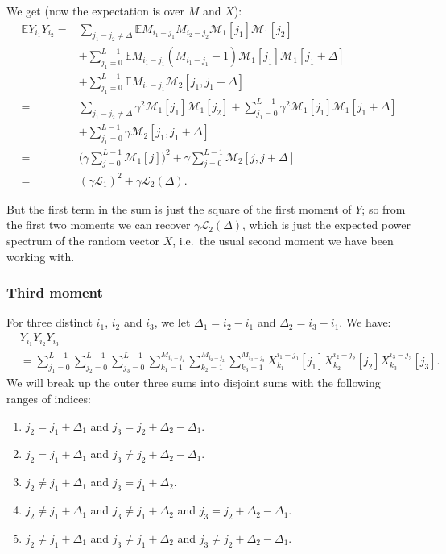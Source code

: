 \documentclass[12pt]{article}
\newcommand{\E}{\mathbb{E}}
\newcommand{\1}{\mathbf{1}}
\newcommand{\M}{\mathcal{M}}
\renewcommand{\L}{\mathcal{L}}
\theoremstyle{plain}
\theoremstyle{definition}
\theoremstyle{remark}
\theoremstyle{plain}
\theoremstyle{remark}
\theoremstyle{plain}
\theoremstyle{plain}
\theoremstyle{plain}
\numberwithin{equation}{section}
\begin{document}
We get (now the expectation is over $M$ and $X$):
%
\begin{align}
%
\E Y_{i_1} Y_{i_2} 
=& \sum_{j_1 - j_2 \ne \Delta} \E M_{i_1-j_1} M_{i_2 - j_2} \M_1[j_1] \M_1[j_2]
\nonumber \\
& + \sum_{j_1 = 0}^{L-1} \E M_{i_1-j_1}(M_{i_1-j_1} - 1) \M_1[j_1] \M_1[j_1 + \Delta]
\nonumber \\
& + \sum_{j_1 = 0}^{L-1} \E M_{i_1-j_1} \M_2[j_1,j_1 + \Delta]
\nonumber \\
=& \sum_{j_1 - j_2 \ne \Delta} \gamma^2 \M_1[j_1] \M_1[j_2]
+ \sum_{j_1 = 0}^{L-1} \gamma^2 \M_1[j_1] \M_1[j_1 + \Delta]
\nonumber \\
& + \sum_{j_1 = 0}^{L-1} \gamma \M_2[j_1,j_1 + \Delta]
\nonumber \\
=&  \bigg(\gamma \sum_{j = 0}^{L-1} \M_1[j] \bigg)^2
+ \gamma \sum_{j = 0}^{L-1} \M_2[j,j + \Delta]
\nonumber \\
=&  (\gamma \L_1)^2 + \gamma \L_2(\Delta).
%
\end{align}

But the first term in the sum is just the square of the first moment of $Y$; so from the first two moments we can recover $\gamma \L_2(\Delta)$, which is just the expected power spectrum of the random vector $X$, i.e.\ the usual second moment we have been working with.


%


\subsubsection{Third moment}

For three distinct $i_1$, $i_2$ and $i_3$, we let $\Delta_1 = i_2 - i_1$ and $\Delta_2 = i_3 - i_1$. We have:
%
\begin{align}
%
&Y_{i_1} Y_{i_2} Y_{i_3}
\nonumber \\
&= \sum_{j_1=0}^{L-1} \sum_{j_2=0}^{L-1} \sum_{j_3=0}^{L-1} 
\sum_{k_1=1}^{M_{i_1-j_1}}\sum_{k_2=1}^{M_{i_2-j_2}} \sum_{k_3=1}^{M_{i_3-j_3}}
X_{k_1}^{i_1-j_1}[j_1] X_{k_2}^{i_2 - j_2}[j_2] X_{k_3}^{i_3 - j_3}[j_3].
\end{align}
%
We will break up the outer three sums into disjoint sums with the following ranges of indices:
%
\begin{enumerate}
	
	\item \label{case1}
	$j_2 = j_1 + \Delta_1$ and $j_3 = j_2 + \Delta_2 - \Delta_1$.
	
	\item \label{case2}
	$j_2 = j_1 + \Delta_1$ and $j_3 \ne j_2 + \Delta_2 - \Delta_1$.
	
	\item \label{case3}
	$j_2 \ne j_1 + \Delta_1$ and $j_3 = j_1 + \Delta_2$.
	
	\item \label{case4}
	$j_2 \ne j_1 + \Delta_1$ and $j_3 \ne j_1 + \Delta_2$ and $j_3 = j_2 + \Delta_2 - \Delta_1$.
	
	\item \label{case5}
	$j_2 \ne j_1 + \Delta_1$ and $j_3 \ne j_1 + \Delta_2$ and $j_3 \ne j_2 + \Delta_2 - \Delta_1$.
	
\end{enumerate}
\end{document}
